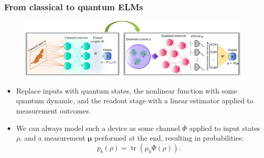 \documentclass{beamer}
\begin{document}






\begin{frame}
\frametitle{From classical to quantum ELMs}

\begin{figure}
\includegraphics[width=0.9\linewidth]{figures/ELMs to QELMs.png}
\end{figure}

\begin{itemize}
    \item Replace inputs with quantum states, the nonlinear function with some quantum dynamic, and the readout stage with a linear estimator applied to measurement outcomes.
    \item We can always model such a device as some channel $\Phi$ applied to input states $\rho$, and a measurement $\boldsymbol\mu$ performed at the end, resulting in probabilities:
    \begin{equation}
        p_b(\rho) = \operatorname{tr}(\mu_b \Phi(\rho)).
    \end{equation}
\end{itemize}

\end{frame}
\end{document}
